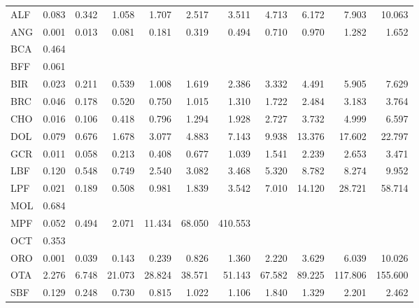 \documentclass[11pt]{article}
\begin{document}
\begin{itemize}
\begin{itemize}
\begin{table}[htb]
\begin{center}
\begin{tabular}{lrrrrrrrrrr}
\hline
 ALF  &  0.083  &  0.342  &   1.058  &   1.707  &   2.517  &    3.511  &   4.713  &   6.172  &    7.903  &   10.063  \\
 ANG  &  0.001  &  0.013  &   0.081  &   0.181  &   0.319  &    0.494  &   0.710  &   0.970  &    1.282  &    1.652  \\
 BCA  &  0.464  &         &          &          &          &           &          &          &           &           \\
 BFF  &  0.061  &         &          &          &          &           &          &          &           &           \\
 BIR  &  0.023  &  0.211  &   0.539  &   1.008  &   1.619  &    2.386  &   3.332  &   4.491  &    5.905  &    7.629  \\
 BRC  &  0.046  &  0.178  &   0.520  &   0.750  &   1.015  &    1.310  &   1.722  &   2.484  &    3.183  &    3.764  \\
 CHO  &  0.016  &  0.106  &   0.418  &   0.796  &   1.294  &    1.928  &   2.727  &   3.732  &    4.999  &    6.597  \\
 DOL  &  0.079  &  0.676  &   1.678  &   3.077  &   4.883  &    7.143  &   9.938  &  13.376  &   17.602  &   22.797  \\
 GCR  &  0.011  &  0.058  &   0.213  &   0.408  &   0.677  &    1.039  &   1.541  &   2.239  &    2.653  &    3.471  \\
 LBF  &  0.120  &  0.548  &   0.749  &   2.540  &   3.082  &    3.468  &   5.320  &   8.782  &    8.274  &    9.952  \\
 LPF  &  0.021  &  0.189  &   0.508  &   0.981  &   1.839  &    3.542  &   7.010  &  14.120  &   28.721  &   58.714  \\
 MOL  &  0.684  &         &          &          &          &           &          &          &           &           \\
 MPF  &  0.052  &  0.494  &   2.071  &  11.434  &  68.050  &  410.553  &          &          &           &           \\
 OCT  &  0.353  &         &          &          &          &           &          &          &           &           \\
 ORO  &  0.001  &  0.039  &   0.143  &   0.239  &   0.826  &    1.360  &   2.220  &   3.629  &    6.039  &   10.026  \\
 OTA  &  2.276  &  6.748  &  21.073  &  28.824  &  38.571  &   51.143  &  67.582  &  89.225  &  117.806  &  155.600  \\
 SBF  &  0.129  &  0.248  &   0.730  &   0.815  &   1.022  &    1.106  &   1.840  &   1.329  &    2.201  &    2.462  \\

\end{tabular}
\end{center}
\end{table}
\end{itemize}
\end{itemize}
\end{document}
